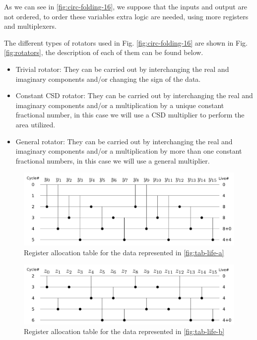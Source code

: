 \documentclass[a4paper, 10pt, conference]{ieeeconf}
\begin{document}
As we can see in \ref{fig:circ-folding-16}, we suppose that the inputs and output are not ordered, to order these variables extra logic are needed, using more registers and multiplexers.

The different types of rotators used in Fig. \ref{fig:circ-folding-16} are shown in Fig. \ref{fig:rotators}, the description of each of them can be found below.

\begin{itemize}

\item Trivial rotator: They can be carried out by interchanging the real and imaginary components and/or changing the sign of the data.
\item Constant CSD rotator: They can be carried out by interchanging the real and imaginary components and/or a multiplication by a unique constant fractional number, in this case we will use a CSD multiplier to perform the area utilized.
\item General rotator: They can be carried out by interchanging the real and imaginary components and/or a multiplication by more than one constant fractional numbers, in this case we will use a general multiplier.

\end{itemize}



\begin{figure}[ht!]
\centering
 \includegraphics[width=1\linewidth]{Diagramas/life_chart_a.png}%
\caption{Register allocation table for the data represented in \ref{fig:tab-life-a}}
\label{fig:tab-aloc-a}
\end{figure}

\begin{figure}[ht!]
\centering
 \includegraphics[width=1\linewidth]{Diagramas/life_chart_b.png}%
\caption{Register allocation table for the data represented in \ref{fig:tab-life-b}}
\label{fig:tab-aloc-b}
\end{figure}
\end{document}
